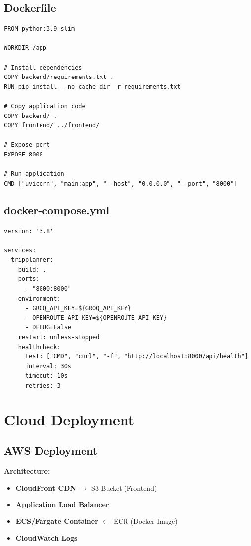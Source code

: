 \documentclass[12pt,a4paper]{report}
\begin{document}
\subsection{Dockerfile}

\begin{lstlisting}[style=bashStyle, caption={Dockerfile}]
FROM python:3.9-slim

WORKDIR /app

# Install dependencies
COPY backend/requirements.txt .
RUN pip install --no-cache-dir -r requirements.txt

# Copy application code
COPY backend/ .
COPY frontend/ ../frontend/

# Expose port
EXPOSE 8000

# Run application
CMD ["uvicorn", "main:app", "--host", "0.0.0.0", "--port", "8000"]
\end{lstlisting}

\subsection{docker-compose.yml}

\begin{lstlisting}[style=bashStyle, caption={Docker Compose Configuration}]
version: '3.8'

services:
  tripplanner:
    build: .
    ports:
      - "8000:8000"
    environment:
      - GROQ_API_KEY=${GROQ_API_KEY}
      - OPENROUTE_API_KEY=${OPENROUTE_API_KEY}
      - DEBUG=False
    restart: unless-stopped
    healthcheck:
      test: ["CMD", "curl", "-f", "http://localhost:8000/api/health"]
      interval: 30s
      timeout: 10s
      retries: 3
\end{lstlisting}

\section{Cloud Deployment}

\subsection{AWS Deployment}

\textbf{Architecture:}
\begin{itemize}
    \item \textbf{CloudFront CDN} $\rightarrow$ S3 Bucket (Frontend)
    \item \textbf{Application Load Balancer}
    \item \textbf{ECS/Fargate Container} $\leftarrow$ ECR (Docker Image)
    \item \textbf{CloudWatch Logs}
\end{itemize}
\end{document}
